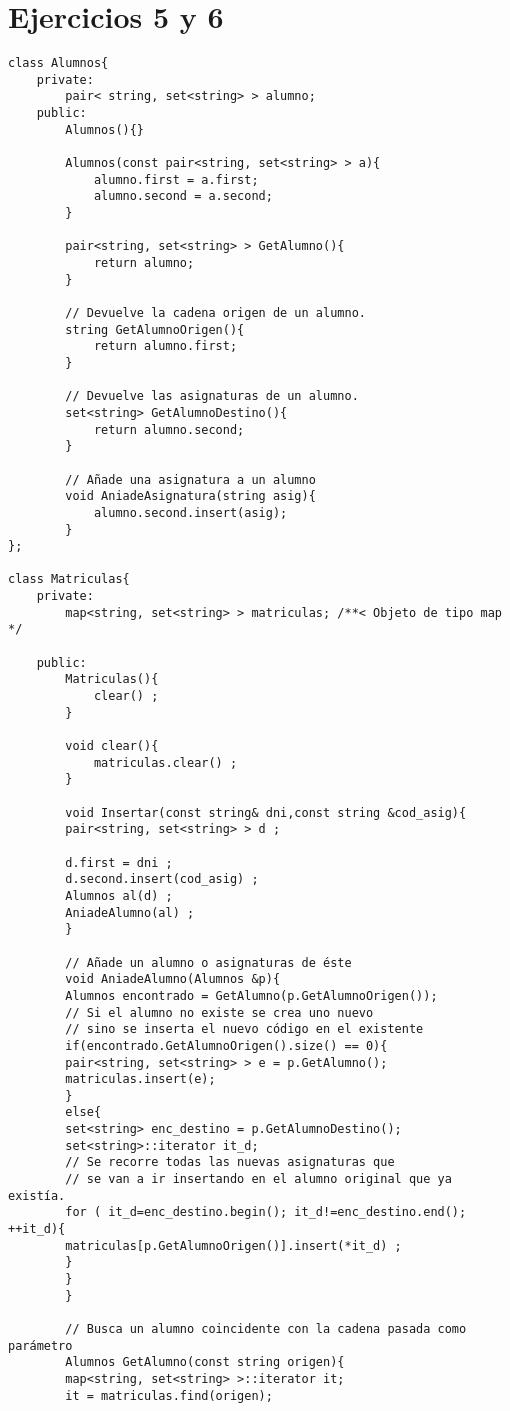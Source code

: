 \section{Ejercicios 5 y 6}
\begin{lstlisting}[style=cmas]
class Alumnos{
	private:
		pair< string, set<string> > alumno;
	public:
		Alumnos(){}
		
		Alumnos(const pair<string, set<string> > a){
			alumno.first = a.first;
			alumno.second = a.second;
		}

		pair<string, set<string> > GetAlumno(){
			return alumno;
		}

		// Devuelve la cadena origen de un alumno.
		string GetAlumnoOrigen(){
			return alumno.first;
		}
		
		// Devuelve las asignaturas de un alumno.
		set<string> GetAlumnoDestino(){
			return alumno.second;
		}
		
		// Añade una asignatura a un alumno
		void AniadeAsignatura(string asig){
			alumno.second.insert(asig);
		}
};

class Matriculas{
	private:
		map<string, set<string> > matriculas; /**< Objeto de tipo map */
	
	public:
		Matriculas(){
			clear() ;
		}
		
		void clear(){
			matriculas.clear() ;
		}
		
		void Insertar(const string& dni,const string &cod_asig){
		pair<string, set<string> > d ;
		
		d.first = dni ;
		d.second.insert(cod_asig) ;
		Alumnos al(d) ;
		AniadeAlumno(al) ;
		}
		
		// Añade un alumno o asignaturas de éste
		void AniadeAlumno(Alumnos &p){
		Alumnos encontrado = GetAlumno(p.GetAlumnoOrigen());
		// Si el alumno no existe se crea uno nuevo
		// sino se inserta el nuevo código en el existente
		if(encontrado.GetAlumnoOrigen().size() == 0){
		pair<string, set<string> > e = p.GetAlumno();
		matriculas.insert(e);
		}
		else{
		set<string> enc_destino = p.GetAlumnoDestino();
		set<string>::iterator it_d;
		// Se recorre todas las nuevas asignaturas que
		// se van a ir insertando en el alumno original que ya existía.
		for ( it_d=enc_destino.begin(); it_d!=enc_destino.end(); ++it_d){
		matriculas[p.GetAlumnoOrigen()].insert(*it_d) ;
		}
		}
		}
		
		// Busca un alumno coincidente con la cadena pasada como parámetro
		Alumnos GetAlumno(const string origen){
		map<string, set<string> >::iterator it;
		it = matriculas.find(origen);
		

\end{lstlisting}
